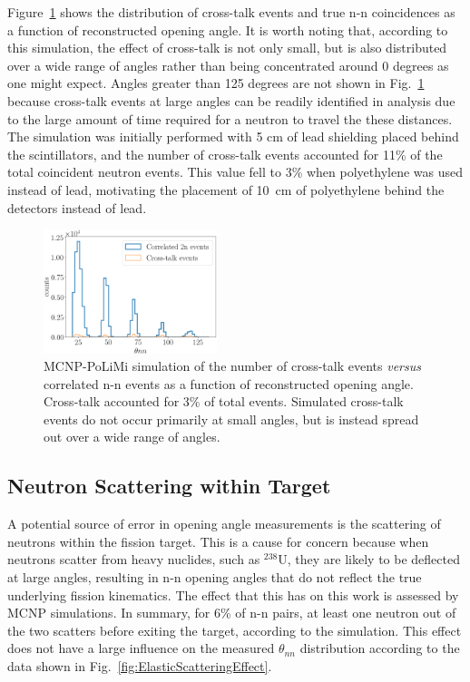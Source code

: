 \documentclass[%
 reprint,
 amsmath,amssymb,
 aps,
 nofootinbib
]{revtex4-1}
\begin{document}
Figure~\ref{fig:CrosstalkVScoincidence} shows the distribution of cross-talk events and true n-n coincidences as a function of reconstructed opening angle.
It is worth noting that, according to this simulation, the effect of cross-talk is not only small, but is also distributed over a wide range of angles rather than being concentrated around 0 degrees as one might expect.
Angles greater than 125 degrees are not shown in Fig.~\ref{fig:CrosstalkVScoincidence} because cross-talk events at large angles can be readily identified in analysis due to the large amount of time required for a neutron to travel the these distances.
The simulation was initially performed with 5 cm of lead shielding placed behind the scintillators, and the number of cross-talk events accounted for 11\% of the total coincident neutron events.
This value fell to 3\% when polyethylene was used instead of lead, motivating the placement of 10~cm of polyethylene behind the detectors instead of lead.
\begin{figure}
    \centering
    \includegraphics[width = 0.45\textwidth]{CrosstalkVScoincidence.png}
    \caption{
    MCNP-PoLiMi simulation of the number of cross-talk events \emph{versus} correlated n-n events as a function of reconstructed opening angle.
    Cross-talk accounted for 3\% of total events.
    Simulated cross-talk events do not occur primarily at small angles, but is instead spread out over a wide range of angles.
    }
    \label{fig:CrosstalkVScoincidence}
\end{figure}

\subsection{Neutron Scattering within Target}
\label{subsection:Elastic_scattering}
A potential source of error in opening angle measurements is the scattering of neutrons within the fission target.
This is a cause for concern because when neutrons scatter from heavy nuclides, such as $^{238}$U, they are likely to be deflected at large angles, resulting in n-n opening angles that do not reflect the true underlying fission kinematics.
The effect that this has on this work is assessed by MCNP simulations.
In summary, for 6\% of n-n pairs, at least one neutron out of the two scatters before exiting the target, according to the simulation.
This effect does not have a large influence on the measured $\theta_{nn}$ distribution according to the data shown in Fig.~\ref{fig:ElasticScatteringEffect}.
\end{document}
